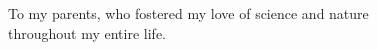\cleardoublepage
{}
{}
\vspace*{.1\textheight}
\begin{center}
  To my parents, who fostered my love of science and nature \\ throughout my entire life.
\end{center}
